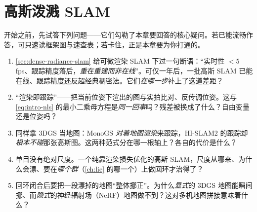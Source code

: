 \chapter{高斯泼溅 SLAM}
\label{ch:gsslam}


\begin{practice}[前置自测]
开始之前，先试答下列问题——它们勾勒了本章要回答的核心疑问。若已能流畅作答，可只速读框架图与速查表；若卡住，正是本章要为你打通的。
\begin{enumerate}
  \item \cref{sec:dense-radiance-slam} 给可微渲染 SLAM 下过一句断语：“实时性 $<5$\,fps、跟踪精度落后，\emph{重在重建而非在线}”。可仅一年后，一批高斯 SLAM 已能在线、跟踪精度还反超经典稠密法。它们\emph{在哪一步}补上了这道差距？
  \item “渲染即跟踪”——把当前位姿下渲出的图与实拍比对、反传调位姿。这与 \cref{eq:intro-nls} 的最小二乘母方程是\emph{同一回事}吗？残差被换成了什么？自由变量还是位姿吗？
  \item 同样拿 3DGS 当地图：MonoGS \emph{对着地图渲染}来跟踪，HI-SLAM2 的跟踪却\emph{根本不碰}那张高斯图。这两种范式分在哪一根轴上？各自的代价是什么？
  \item 单目没有绝对尺度。一个纯靠渲染损失优化的高斯 SLAM，尺度从哪来、为什么会漂、要在\emph{哪个群}（\cref{ch:lie} 的哪一个）上做回环才治得了？
  \item 回环闭合后要把一段漂掉的地图“整体挪正”。为什么\emph{显式}的 3DGS 地图能瞬间挪、而\emph{隐式}的神经辐射场（NeRF）地图做不到？这对多机地图拼接意味着什么？
\end{enumerate}
\end{practice}

